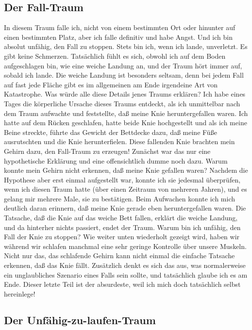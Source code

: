 \subsection{Der Fall-Traum}\hypertarget{c3_5b}{}

In diesem Traum falle ich, nicht von einem bestimmten Ort oder hinunter auf einen bestimmten Platz, aber ich falle definitiv und habe Angst.
Und ich bin absolut unfähig, den Fall zu stoppen.
Stets bin ich, wenn ich lande, unverletzt.
Es gibt keine Schmerzen.
Tatsächlich fühlt es sich, obwohl ich auf dem Boden aufgeschlagen bin, wie eine weiche Landung an, und der Traum hört immer auf, sobald ich lande.
Die weiche Landung ist besonders seltsam, denn bei jedem Fall auf fast jede Fläche gibt es im allgemeinen am Ende irgendeine Art von Katastrophe.
Was würde alle diese Details jenes Traums erklären?
Ich habe eines Tages die körperliche Ursache dieses Traums entdeckt, als ich unmittelbar nach dem Traum aufwachte und feststellte, daß meine Knie heruntergefallen waren.
Ich hatte auf dem Rücken geschlafen, hatte beide Knie hochgestellt und als ich meine Beine streckte, führte das Gewicht der Bettdecke dazu, daß meine Füße ausrutschten und die Knie herunterfielen.
Diese fallenden Knie brachten mein Gehirn dazu, den Fall-Traum zu erzeugen!
Zunächst war das nur eine hypothetische Erklärung und eine offensichtlich dumme noch dazu.
Warum konnte mein Gehirn nicht erkennen, daß meine Knie gefallen waren?
Nachdem die Hypothese aber erst einmal aufgestellt war, konnte ich sie jedesmal überprüfen, wenn ich diesen Traum hatte (über einen Zeitraum von mehreren Jahren), und es gelang mir mehrere Male, sie zu bestätigen.
Beim Aufwachen konnte ich mich deutlich daran erinnern, daß meine Knie gerade eben heruntergefallen waren.
Die Tatsache, daß die Knie auf das weiche Bett fallen, erklärt die weiche Landung, und da hinterher nichts passiert, endet der Traum.
Warum bin ich unfähig, den Fall der Knie zu stoppen?
Wie weiter unten wiederholt gezeigt wird, haben wir während wir schlafen manchmal eine sehr geringe Kontrolle über unsere Muskeln.
Nicht nur das, das schlafende Gehirn kann nicht einmal die einfache Tatsache erkennen, daß das Knie fällt.
Zusätzlich denkt es sich das aus, was normalerweise ein unglaubliches Szenario eines Falls sein sollte, und tatsächlich glaube ich es am Ende.
Dieser letzte Teil ist der absurdeste, weil ich mich doch tatsächlich selbst hereinlege!


\subsection{Der Unfähig-zu-laufen-Traum}\hypertarget{c3_5c}{}

